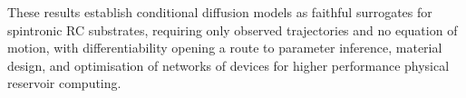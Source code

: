 \documentclass[runningheads]{llncs}
\begin{document}
These results establish conditional diffusion models as faithful surrogates for spintronic RC substrates, %
requiring only observed trajectories and no equation of motion, with differentiability opening a route to parameter inference, material design, and optimisation of networks of devices for higher performance physical reservoir computing.

\vspace{-1ex}
{\footnotesize
\printbibliography}
\end{document}
